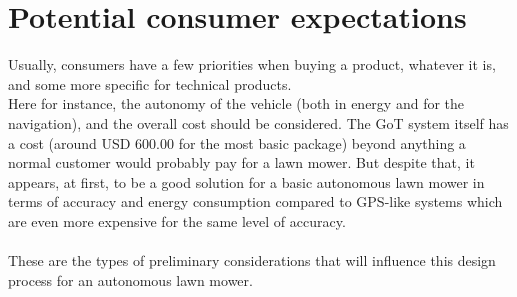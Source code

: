 \section{Potential consumer expectations}
Usually, consumers have a few priorities when buying a product, whatever it is, and some more specific for technical products.\\
Here for instance, the autonomy of the vehicle (both in energy and for the navigation), and the overall cost should be considered. The GoT system itself has a cost (around USD 600.00 for the most basic package) beyond anything a normal customer would probably pay for a lawn mower. But despite that, it appears, at first, to be a good solution for a basic autonomous lawn mower in terms of accuracy and energy consumption compared to GPS-like systems which are even more expensive for the same level of accuracy. \\\\
These are the types of preliminary considerations that will influence this design process for an autonomous lawn mower.
